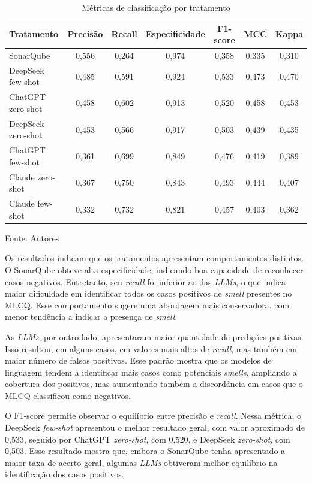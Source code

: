 \begin{table}[H]
\centering
\caption{Métricas de classificação por tratamento}
\label{tab:metricas-classificacao-tratamento}
\begin{tabular}{lcccccc}
\hline
Tratamento & Precisão & Recall & Especificidade & F1-score & MCC & Kappa \\
\hline
SonarQube & 0,556 & 0,264 & 0,974 & 0,358 & 0,335 & 0,310 \\
DeepSeek few-shot & 0,485 & 0,591 & 0,924 & 0,533 & 0,473 & 0,470 \\
ChatGPT zero-shot & 0,458 & 0,602 & 0,913 & 0,520 & 0,458 & 0,453 \\
DeepSeek zero-shot & 0,453 & 0,566 & 0,917 & 0,503 & 0,439 & 0,435 \\
ChatGPT few-shot & 0,361 & 0,699 & 0,849 & 0,476 & 0,419 & 0,389 \\
Claude zero-shot & 0,367 & 0,750 & 0,843 & 0,493 & 0,444 & 0,407 \\
Claude few-shot & 0,332 & 0,732 & 0,821 & 0,457 & 0,403 & 0,362 \\
\hline
\end{tabular}

Fonte: Autores
\end{table}

Os resultados indicam que os tratamentos apresentam comportamentos distintos. O SonarQube obteve alta especificidade, indicando boa capacidade 
de reconhecer casos negativos. Entretanto, seu \textit{recall} foi inferior ao das \textit{LLMs}, o que indica maior dificuldade em identificar 
todos os casos positivos de \textit{smell} presentes no MLCQ. Esse comportamento sugere uma abordagem mais conservadora, com menor tendência 
a indicar a presença de \textit{smell}.

As \textit{LLMs}, por outro lado, apresentaram maior quantidade de predições positivas. Isso resultou, em alguns casos, em valores mais altos de \textit{recall}, 
mas também em maior número de falsos positivos. Esse padrão mostra que os modelos de linguagem tendem a identificar mais casos como 
potenciais \textit{smells}, ampliando a cobertura dos positivos, mas aumentando também a discordância em casos que o MLCQ classificou como negativos.
 
O F1-score permite observar o equilíbrio entre precisão e \textit{recall}. Nessa métrica, o DeepSeek \textit{few-shot} apresentou o melhor resultado geral, 
com valor aproximado de 0,533, seguido por ChatGPT \textit{zero-shot}, com 0,520, e DeepSeek \textit{zero-shot}, com 0,503. Esse resultado mostra que, 
embora o SonarQube tenha apresentado a maior taxa de acerto geral, algumas \textit{LLMs} obtiveram melhor equilíbrio na identificação dos casos positivos.


